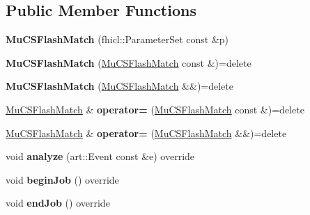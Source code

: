\subsection*{Public Member Functions}
\begin{DoxyCompactItemize}
\item 
{\bfseries Mu\+C\+S\+Flash\+Match} (fhicl\+::\+Parameter\+Set const \&p)\hypertarget{classMuCSFlashMatch_a62514ddde6a8cf63e3db49649f310468}{}\label{classMuCSFlashMatch_a62514ddde6a8cf63e3db49649f310468}

\item 
{\bfseries Mu\+C\+S\+Flash\+Match} (\hyperlink{classMuCSFlashMatch}{Mu\+C\+S\+Flash\+Match} const \&)=delete\hypertarget{classMuCSFlashMatch_ac77d995753767965120cb78c4942e00c}{}\label{classMuCSFlashMatch_ac77d995753767965120cb78c4942e00c}

\item 
{\bfseries Mu\+C\+S\+Flash\+Match} (\hyperlink{classMuCSFlashMatch}{Mu\+C\+S\+Flash\+Match} \&\&)=delete\hypertarget{classMuCSFlashMatch_afced500e296fe05c37e0f1fe112656a9}{}\label{classMuCSFlashMatch_afced500e296fe05c37e0f1fe112656a9}

\item 
\hyperlink{classMuCSFlashMatch}{Mu\+C\+S\+Flash\+Match} \& {\bfseries operator=} (\hyperlink{classMuCSFlashMatch}{Mu\+C\+S\+Flash\+Match} const \&)=delete\hypertarget{classMuCSFlashMatch_aa10a3d1be2ea8418188c227d7c4d8864}{}\label{classMuCSFlashMatch_aa10a3d1be2ea8418188c227d7c4d8864}

\item 
\hyperlink{classMuCSFlashMatch}{Mu\+C\+S\+Flash\+Match} \& {\bfseries operator=} (\hyperlink{classMuCSFlashMatch}{Mu\+C\+S\+Flash\+Match} \&\&)=delete\hypertarget{classMuCSFlashMatch_a32339a6105ca8917adedc979b7c7e1da}{}\label{classMuCSFlashMatch_a32339a6105ca8917adedc979b7c7e1da}

\item 
void {\bfseries analyze} (art\+::\+Event const \&e) override\hypertarget{classMuCSFlashMatch_a17c649cc0efeb756d5432933aa6304cb}{}\label{classMuCSFlashMatch_a17c649cc0efeb756d5432933aa6304cb}

\item 
void {\bfseries begin\+Job} () override\hypertarget{classMuCSFlashMatch_a578dda78eddb4be556e8ddd40b4da5ea}{}\label{classMuCSFlashMatch_a578dda78eddb4be556e8ddd40b4da5ea}

\item 
void {\bfseries end\+Job} () override\hypertarget{classMuCSFlashMatch_a2318ec9d880d49696596a93848c38e2c}{}\label{classMuCSFlashMatch_a2318ec9d880d49696596a93848c38e2c}

\end{DoxyCompactItemize}
